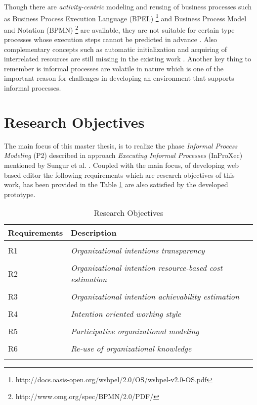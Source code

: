 Though there are \textit{activity-centric} modeling and reusing of business processes such as Business Process Execution Language (BPEL) \footnote{http://docs.oasis-open.org/wsbpel/2.0/OS/wsbpel-v2.0-OS.pdf} and Business Process Model and Notation (BPMN) \footnote{http://www.omg.org/spec/BPMN/2.0/PDF/} are available, they are not suitable for certain type processes whose execution steps cannot be predicted in advance \cite{Sungur2014a}. Also complementary concepts such as automatic initialization and acquiring of interrelated resources are still missing in the existing work \cite{Sungur2015}. Another key thing to remember is informal processes are volatile in nature which is one of the important reason for challenges in developing an environment that supports informal processes.

\section {Research Objectives}
\label{sec:researchobjectives}
The main focus of this master thesis, is to realize the phase \textit{Informal Process Modeling} (P2) described in approach \textit{Executing Informal Processes} (InProXec) mentioned by Sungur et al. \cite{Sungur2015}. Coupled with the main focus, of developing web based editor the following requirements which are research objectives of this work, has been provided in the Table \ref{tab:researchobjectives} are also satisfied by the developed prototype. 

\label{sec:researchobj}
\begin{center}
	\begin{longtable}{p{5cm}p{11cm}} 
   	\toprule 
	\textbf{Requirements} & \textbf{Description} \\
	\midrule
	\endfirsthead
	\\
	R1 & \textit{Organizational intentions transparency}  \label{ro1} \\
	\\[-1.5ex]
	R2 & \textit{Organizational intention resource-based cost estimation}  \label{ro2} \\
	\\[-1.5ex]
	R3 & \textit{Organizational intention achievability estimation} \label{ro3}\\
	\\[-1.5ex]
	R4 & \textit{Intention oriented working style}  \label{ro4}\\
	\\[-1.5ex]
	R5 & \textit{Participative organizational modeling}\label{ro5}\\
	\\[-1.5ex]
	R6 & \textit{Re-use of organizational knowledge} \label{ro6}\\
	
	\bottomrule
	\caption{Research Objectives}
	\label{tab:researchobjectives}
	\end{longtable}	
\end{center}

